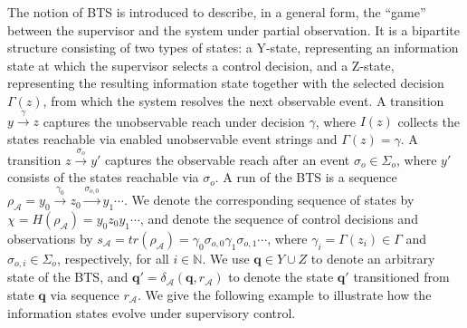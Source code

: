 \documentclass[journal,twoside,web]{ieeecolor}
\begin{document}
The notion of BTS is introduced to describe, in a general form, the ``game'' between the supervisor and the system under partial observation. 
%
It is a bipartite structure consisting of two types of states: a Y-state, representing an information state at which the supervisor selects a control decision, and a Z-state, representing the resulting information state together with the selected decision $\Gamma(z)$, from which the system resolves the next observable event.
%
A transition $y \xrightarrow{\gamma} z$ captures the unobservable reach under decision $\gamma$, where $I(z)$ collects the states reachable via enabled unobservable event strings and $\Gamma(z)=\gamma$. 
A transition $z \xrightarrow{\sigma_o} y'$ captures the observable reach after an event $\sigma_o \in \Sigma_o$, where $y'$ consists of the states reachable via $\sigma_o$.
%
A run of the BTS is a sequence $\rho_{\mathcal{A}} = y_0 \xrightarrow{\gamma_0} z_0 \xrightarrow{\sigma_{o,0}} y_1 \cdots$.
We denote the corresponding sequence of states by
$\chi = H(\rho_{\mathcal{A}}) = y_0 z_0 y_1 \cdots$, and denote the sequence of control decisions and observations by 
$s_{\mathcal{A}} = tr(\rho_{\mathcal{A}}) = \gamma_0 \sigma_{o,0} \gamma_1 \sigma_{o,1} \cdots$, 
where $\gamma_i = \Gamma(z_i) \in \Gamma$ and $\sigma_{o,i} \in \Sigma_o$, respectively, for all $i \in \mathbb{N}$.
We use $\bm{q} \in Y \cup Z$ to denote an arbitrary state of the BTS, and $\bm{q}' = \delta_{\mathcal{A}}(\bm{q}, r_{\mathcal{A}})$ to denote the state $\bm{q}'$ transitioned from state $\bm{q}$ via sequence $r_{\mathcal{A}}$.
%
We give the following example to illustrate how the information states evolve under supervisory control.
\end{document}

